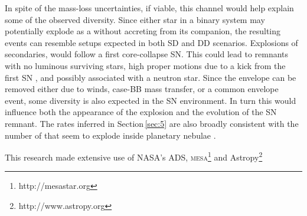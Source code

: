 \documentclass[twocolumn]{aa}
\begin{document}
In spite of the mass-loss 
uncertainties, if viable, this channel would help explain some of the observed \ia diversity. Since either star in a binary system may potentially explode 
as a \ia without accreting from its  companion, the resulting events can resemble setups expected in both SD and DD scenarios. Explosions of 
secondaries, would follow a first core-collapse SN. This 
could lead to \ia remnants with no luminous surviving stars, high proper motions due to a kick from the first SN \cite[like the Kepler SN remnant,][]{Chiotellis:2011jy}, and  possibly associated with a neutron star. 
Since the  envelope can be removed either due to winds, case-BB mass transfer, or a common envelope event, some diversity is also expected in 
the SN environment. In turn this would influence both the 
appearance of the explosion and the evolution of the SN remnant. The rates inferred in Section\,\ref{sec:5} are also broadly consistent with the 
number of \ias that seem to explode inside planetary 
nebulae \citep[$\sim 20\%$;][]{Tsebrenko:2014kea}.  
          



\begin{acknowledgements}
%
 This research made extensive use of NASA's ADS, \textsc{mesa}\footnote{http://mesastar.org} \citep{Paxton:2010ji,Paxton:2013pj,Paxton:2015jva,Paxton:2017eie} and Astropy\footnote{http://www.astropy.org} \citep{Price-Whelan:2018hus}
\end{acknowledgements}


 

\end{document}
